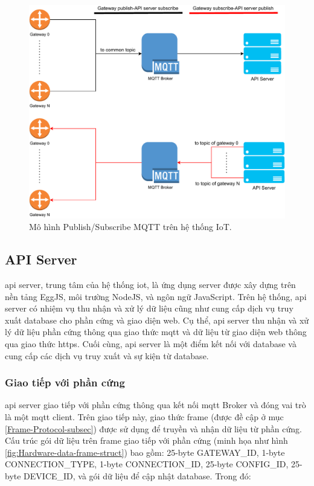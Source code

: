 \begin{figure}[htp]
\centering
\includegraphics[width=1.0\linewidth]{images/Thesis-Page-11-MQTT-Connect-Establish.pdf}
\caption{Mô hình Publish/Subscribe MQTT trên hệ thống IoT.}
\label{fig:Frame-Parsing-Process-2}
\end{figure}

\subsection{API Server}

\acrshort{api} server, trung tâm của hệ thống \acrshort{iot}, là ứng dụng server được xây dựng trên nền tảng EggJS, môi trường NodeJS, và ngôn ngữ JavaScript. Trên hệ thống, \acrshort{api} server có nhiệm vụ thu nhận và xử lý dữ liệu cũng như cung cấp dịch vụ truy xuất database cho phần cứng và giao diện web. Cụ thể, \acrshort{api} server thu nhận và xử lý dữ liệu phần cứng thông qua giao thức \acrshort{mqtt} và dữ liệu từ giao diện web thông qua giao thức \acrshort{https}. Cuối cùng, \acrshort{api} server là một điểm kết nối với database và cung cấp các dịch vụ truy xuất và sự kiện từ database.

\subsubsection{Giao tiếp với phần cứng}

\acrshort{api} server giao tiếp với phần cứng thông qua kết nối \acrshort{mqtt} Broker và đóng vai trò là một \acrshort{mqtt} client. Trên giao tiếp này, giao thức frame (được đề cập ở mục \ref{Frame-Protocol-subsec}) được sử dụng để truyền và nhận dữ liệu từ phần cứng.
Cấu trúc gói dữ liệu trên frame giao tiếp với phần cứng (minh họa như hình \ref{fig:Hardware-data-frame-struct}) bao gồm: 25-byte GATEWAY\_ID, 1-byte CONNECTION\_TYPE, 1-byte CONNECTION\_ID, 25-byte CONFIG\_ID, 25-byte DEVICE\_ID, và gói dữ liệu để cập nhật database. Trong đó:

